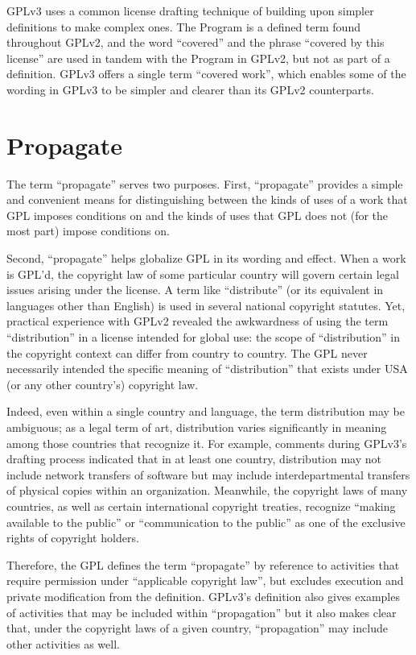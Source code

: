 GPLv3 uses a common license drafting technique of building upon simpler
definitions to make complex ones.  The Program is a defined term found
throughout GPLv2, and the word ``covered'' and the phrase ``covered by this
license'' are used in tandem with the Program in GPLv2, but not as part of a
definition.  GPLv3 offers a single term ``covered work'', which enables some
of the wording in GPLv3 to be simpler and clearer than its GPLv2
counterparts.

\section{Propagate}

The term ``propagate'' serves two purposes.  First, ``propagate'' provides a
simple and convenient means for distinguishing between the kinds of uses of a
work that GPL imposes conditions on and the kinds of uses that GPL does not
(for the most part) impose conditions on.

Second, ``propagate'' helps globalize GPL in its wording and effect.  When a
work is GPL'd, the copyright law of some particular country will govern
certain legal issues arising under the license.  A term like ``distribute''
(or its equivalent in languages other than English) is used in several
national copyright statutes.  Yet, practical experience with GPLv2 revealed
the awkwardness of using the term ``distribution'' in a license intended for
global use: the scope of ``distribution'' in the copyright context can differ
from country to country.  The GPL never necessarily intended the specific
meaning of ``distribution'' that exists under USA (or any other country's)
copyright law.

Indeed, even within a single country and language, the term distribution may
be ambiguous; as a legal term of art, distribution varies significantly in
meaning among those countries that recognize it.  For example, comments
during GPLv3's drafting process indicated that in at least one country,
distribution may not include network transfers of software but may include
interdepartmental transfers of physical copies within an organization.
Meanwhile, the copyright laws of many countries, as well as certain
international copyright treaties, recognize ``making available to the
public'' or ``communication to the public'' as one of the exclusive rights of
copyright holders.

Therefore, the GPL defines the term ``propagate'' by reference to activities
that require permission under ``applicable copyright law'', but excludes
execution and private modification from the definition.  GPLv3's definition
also gives examples of activities that may be included within ``propagation''
but it also makes clear that, under the copyright laws of a given country,
``propagation'' may include other activities as well.

